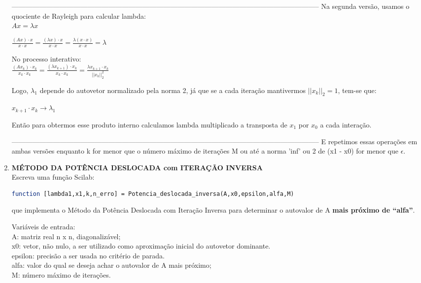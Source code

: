 \documentclass[leqno]{article}
\numberwithin{equation}{section}
\begin{document}
\begin{enumerate}
\begin{sol}
	--------------------------------------------------------------------------------------------------------------------------------------
	Na segunda versão, usamos o quociente de Rayleigh para calcular lambda:\\
	$Ax = \lambda x$
	
	$\frac{(Ax) \cdot x}{x \cdot x} = \frac{(\lambda x) \cdot x}{x \cdot x} = \frac{\lambda (x \cdot x)}{x \cdot x} = \lambda$
	
	No processo interativo:\\
	$\frac{(Ax_k) \cdot x_k}{x_k \cdot x_k} = \frac{(\lambda x_{k+1}) \cdot x_k}{x_k \cdot x_k} = \frac{\lambda x_{k+1} \cdot x_k}{||x_k||^2_2}$
	
	Logo, $\lambda_1$ depende do autovetor normalizado pela norma 2, já que se a cada iteração mantivermos $||x_k||_2 = 1$, tem-se que:
	
	$x_{k+1} \cdot x_k \rightarrow \lambda_1$
	
	Então para obtermos esse produto interno calculamos lambda multiplicado a transposta de $x_1$ por $x_0$ a cada interação. 
	
	--------------------------------------------------------------------------------------------------------------------------------------	
	E repetimos essas operações em ambas versões enquanto k for menor que o número máximo de iterações M ou até a norma 'inf' ou 2 de (x1 - x0) for menor que $\epsilon$.
	
	
		\end{sol}
		
		\item \textbf{{\large MÉTODO DA POTÊNCIA DESLOCADA com ITERAÇÃO INVERSA}}\\
		
		Escreva uma função Scilab:\\
		\begin{lstlisting}[language=Scilab]
function [lambda1,x1,k,n_erro] = Potencia_deslocada_inversa(A,x0,epsilon,alfa,M)

		\end{lstlisting}
	
		que implementa o Método da Potência Deslocada com Iteração Inversa para
		determinar o autovalor de A \textbf{mais próximo de “alfa”}.\\
		
		\begin{tcolorbox}[colback=green!5,colframe=green!40!black]
		Variáveis de entrada:\\
		A: matriz real n x n, diagonalizável;\\
		x0: vetor, não nulo, a ser utilizado como aproximação inicial do autovetor dominante.\\
		epsilon: precisão a ser usada no critério de parada.\\
		alfa: valor do qual se deseja achar o autovalor de A mais próximo;\\
		M: número máximo de iterações.\\
		\end{tcolorbox}


\end{enumerate}
\end{document}
